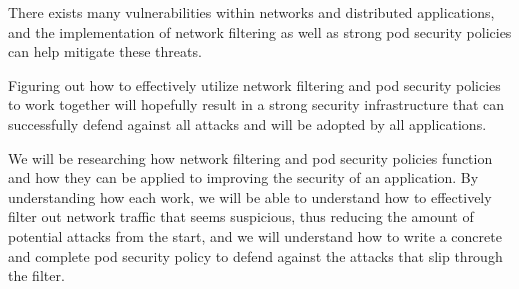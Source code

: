 There exists many vulnerabilities within networks and distributed 
applications, and the implementation of network filtering
as well as strong pod security policies can help mitigate
these threats.

Figuring out how to effectively utilize network filtering and
pod security policies to work together will hopefully result
in a strong security infrastructure that can successfully
defend against all attacks and will be adopted by all applications.

We will be researching how network filtering and pod security policies
function and how they can be applied to improving the security of
an application. By understanding how each work, we will be able to
understand how to effectively filter out network traffic that seems
suspicious, thus reducing the amount of potential attacks from the
start, and we will understand how to write a concrete and complete
pod security policy to defend against the attacks that slip through
the filter.

